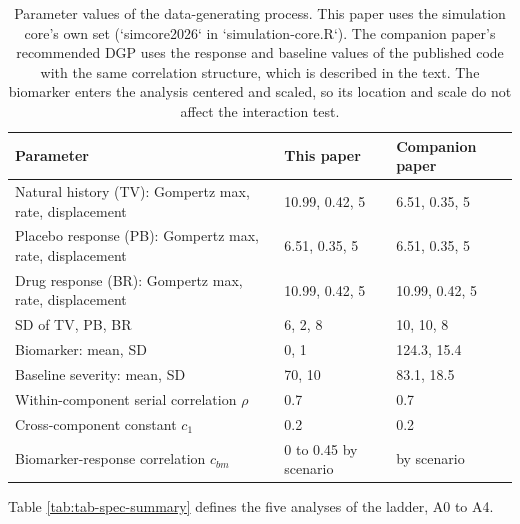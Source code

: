 \documentclass[
  11pt,
]{article}
\begin{document}
\begin{table}
\centering
\caption{\label{tab:tab-params}Parameter values of the data-generating process. This
    paper uses the simulation core's own set (`simcore2026` in
    `simulation-core.R`). The companion paper's recommended DGP uses
    the response and baseline values of the published code with the
    same correlation structure, which is described in the text. The biomarker enters the analysis centered and scaled, so its
    location and scale do not affect the interaction test.}
\centering
\fontsize{8}{10}\selectfont
\begin{tabular}[t]{>{\raggedright\arraybackslash}p{7cm}ll}
\toprule
Parameter & This paper & Companion paper\\
\midrule
Natural history (TV): Gompertz max, rate, displacement & 10.99, 0.42, 5 & 6.51, 0.35, 5\\
Placebo response (PB): Gompertz max, rate, displacement & 6.51, 0.35, 5 & 6.51, 0.35, 5\\
Drug response (BR): Gompertz max, rate, displacement & 10.99, 0.42, 5 & 10.99, 0.42, 5\\
SD of TV, PB, BR & 6, 2, 8 & 10, 10, 8\\
Biomarker: mean, SD & 0, 1 & 124.3, 15.4\\
Baseline severity: mean, SD & 70, 10 & 83.1, 18.5\\
Within-component serial correlation $\rho$ & 0.7 & 0.7\\
Cross-component constant $c_1$ & 0.2 & 0.2\\
Biomarker-response correlation $c_{bm}$ & 0 to 0.45 by scenario & by scenario\\
\bottomrule
\end{tabular}
\end{table}

Table \ref{tab:tab-spec-summary} defines the five analyses of the
ladder, A0 to A4.
\end{document}
